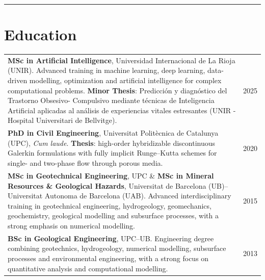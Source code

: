 \documentclass[10pt,a4paper]{article}
\newcommand{\ruledsection}[1]{%
  \par\vspace{3pt}%
  {\color{hair}\rule{\textwidth}{0.6pt}}%
  \vspace{-3pt}%
  \section{#1}%
}
\newcommand{\dates}[1]{{\sffamily\fontsize{8.8}{10.5}\selectfont\color{muted}#1}}
\newcommand{\org}[1]{{\color{ink}\textbf{#1}}}
\begin{document}
\ruledsection{Education}
\vspace{-5.5pt}
\begin{tabularx}{\textwidth}{@{}X r@{}}
	
	\org{MSc in Artificial Intelligence}, Universidad Internacional de La Rioja (UNIR).
	Advanced training in machine learning, deep learning, data-driven modelling, optimization and artificial intelligence for complex computational problems.
	\textbf{Minor Thesis}: Predicción y diagnóstico
	del Trastorno Obsesivo-
	Compulsivo mediante técnicas
	de Inteligencia Artificial
	aplicadas al análisis de
	experiencias vitales estresantes (UNIR - Hospital Universitari de Bellvitge).
	& \dates{2025} \\[2pt]
	
	\org{PhD in Civil Engineering}, Universitat Politècnica de Catalunya (UPC), \textit{Cum laude}.
	\textbf{Thesis}: high-order hybridizable discontinuous Galerkin formulations with fully implicit Runge--Kutta schemes for single- and two-phase flow through porous media.
	& \dates{2020} \\[2pt]
	
	\org{MSc in Geotechnical Engineering}, UPC
     \&
	\org{MSc in Mineral Resources \& Geological Hazards}, Universitat de Barcelona (UB)--Universitat Autonoma de Barcelona (UAB).
	Advanced interdisciplinary training in geotechnical engineering, hydrogeology, geomechanics, geochemistry, geological modelling and subsurface processes, with a strong emphasis on numerical modelling.
	& \dates{2015} \\[2pt]
	
	\org{BSc in Geological Engineering}, UPC--UB.
	Engineering degree combining geotechnics, hydrogeology, numerical modelling, subsurface processes and environmental engineering, with a strong focus on quantitative analysis and computational modelling.
	& \dates{2013} \\
	
\end{tabularx}
\end{document}

